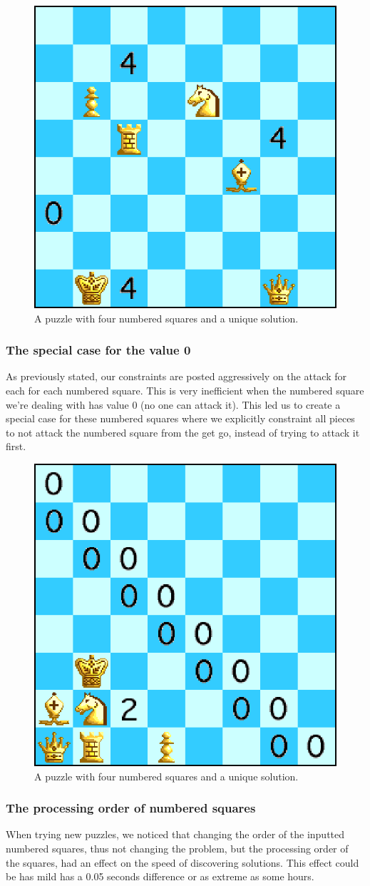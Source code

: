 \documentclass[runningheads]{llncs}
\begin{document}
\begin{figure}[H]
  \centering
  \includegraphics[width=0.4\linewidth]{figures/chess2.eps}
  \caption{A puzzle with four numbered squares and a unique solution.}\label{fig:fig4}
\end{figure}

\subsubsection{The special case for the value 0}
As previously stated, our constraints are posted aggressively on the attack
for each for each numbered square. This is very inefficient when the numbered
square we're dealing with has value 0 (no one can attack it). This led us to
create a special case for these numbered squares where we explicitly constraint
all pieces to not attack the numbered square from the get go, instead of
trying to attack it first.

\begin{figure}[H]
  \centering
  \includegraphics[width=0.4\linewidth]{figures/chess8.eps}
  \caption{A puzzle with four numbered squares and a unique solution.}\label{fig:fig5}
\end{figure}

\subsubsection{The processing order of numbered squares}
When trying new puzzles, we noticed that changing the order of the inputted
numbered squares, thus not changing the problem, but the processing order
of the squares, had an effect on the speed of discovering solutions. This
effect could be has mild has a 0.05 seconds difference or as extreme as some
hours.
\end{document}
